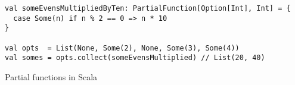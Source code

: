 \begin{algorithm}
\begin{verbatim}
val someEvensMultipliedByTen: PartialFunction[Option[Int], Int] = {
  case Some(n) if n % 2 == 0 => n * 10
}

val opts  = List(None, Some(2), None, Some(3), Some(4))
val somes = opts.collect(someEvensMultiplied) // List(20, 40)
\end{verbatim}

\caption{Partial functions in Scala \label{scala:partial-function}}
\end{algorithm}